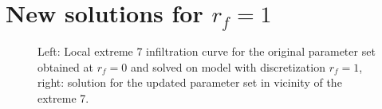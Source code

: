 \documentclass[review]{elsarticle}
\begin{document}
\section{New solutions for $r_f=1$}

\begin{figure}
\label{rf0examples}
\caption{Left: Local extreme 7 infiltration curve for the original parameter set obtained at $r_f=0$ and solved on model with discretization $r_f=1$, right: solution for the updated parameter set in  vicinity of the extreme 7.}
\end{figure}
\end{document}
